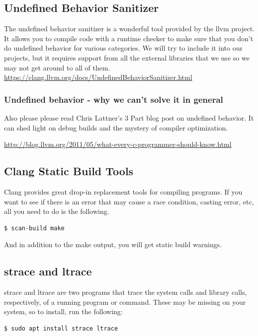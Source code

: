 \subsection{Undefined Behavior Sanitizer}

The undefined behavior sanitizer is a wonderful tool provided by the llvm project.
It allows you to compile code with a runtime checker to make sure that you don't do undefined behavior for various categories.
We will try to include it into our projects, but it requires support from all the external libraries that we use so we may not get around to all of them.
\url{https://clang.llvm.org/docs/UndefinedBehaviorSanitizer.html}

\subsubsection{Undefined behavior - why we can't solve it in general}

Also please please read Chris Lattner's 3 Part blog post on undefined behavior. It can shed light on debug builds and the mystery of compiler optimization.

\url{http://blog.llvm.org/2011/05/what-every-c-programmer-should-know.html}


\subsection{Clang Static Build Tools}

Clang provides great drop-in replacement tools for compiling programs.
If you want to see if there is an error that may cause a race condition, casting error, etc, all you need to do is the following.

\begin{lstlisting}[language=bash]
$ scan-build make
\end{lstlisting}

And in addition to the make output, you will get static build warnings.

\subsection{strace and ltrace}

strace and ltrace are two programs that trace the system calls and library calls, respectively, of a running program or command.
These may be missing on your system, so to install, run the following:

\begin{lstlisting}[language=bash]
$ sudo apt install strace ltrace
\end{lstlisting}

